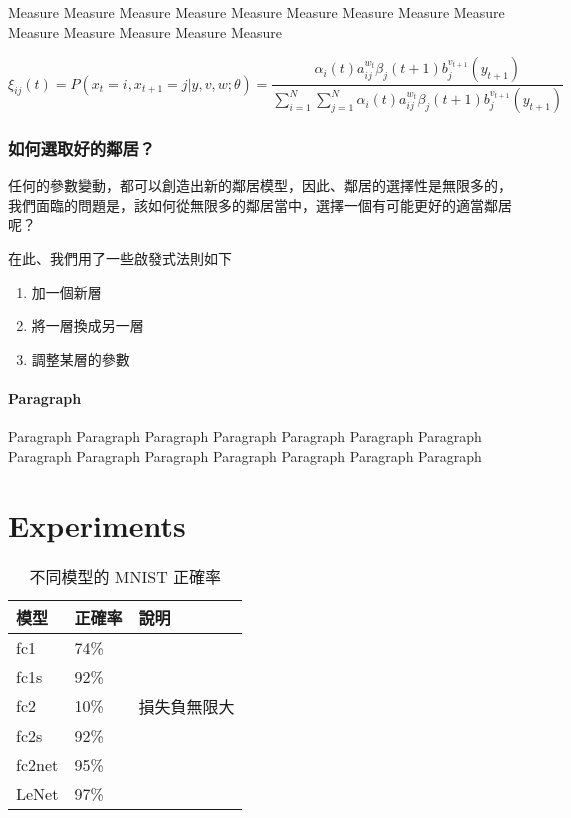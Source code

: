 \documentclass{article}
\begin{document}
Measure Measure Measure Measure Measure Measure Measure Measure Measure Measure Measure Measure Measure Measure 

\begin{equation}
\xi _{ij}(t)=P(x_{t}=i,x_{t+1}=j|y,v,w;\theta)= {\frac {\alpha _{i}(t)a^{w_t}_{ij}\beta _{j}(t+1)b^{v_{t+1}}_{j}(y_{t+1})}{\sum _{i=1}^{N} \sum _{j=1}^{N} \alpha _{i}(t)a^{w_t}_{ij}\beta _{j}(t+1)b^{v_{t+1}}_{j}(y_{t+1})}}
\end{equation}

\subsubsection{如何選取好的鄰居？}

任何的參數變動，都可以創造出新的鄰居模型，因此、鄰居的選擇性是無限多的，我們面臨的問題是，該如何從無限多的鄰居當中，選擇一個有可能更好的適當鄰居呢？

在此、我們用了一些啟發式法則如下

\begin{enumerate}  
\item 加一個新層 
\item 將一層換成另一層
\item 調整某層的參數
\end{enumerate}

\paragraph{Paragraph}

Paragraph Paragraph Paragraph Paragraph Paragraph Paragraph Paragraph Paragraph Paragraph Paragraph Paragraph Paragraph Paragraph Paragraph 

\section{Experiments}
\label{sec:others}

\begin{table}
 \caption{不同模型的 MNIST 正確率}
  \centering
  \begin{tabular}{lll}
    模型     & 正確率     & 說明 \\
    \midrule
    fc1 & 74\% &       \\
    fc1s & 92\% &       \\
    fc2 & 10\% & 損失負無限大 \\
    fc2s & 92\% &       \\
    fc2net & 95\% &       \\
    LeNet & 97\%  &      \\
    \bottomrule
  \end{tabular}
  \label{tab:table}
\end{table}
\end{document}
